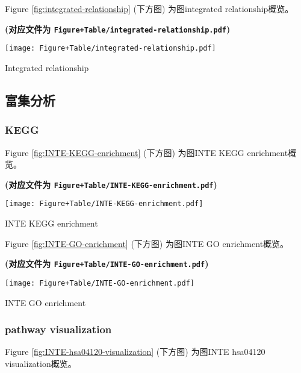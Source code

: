 \documentclass[
]{article}
\begin{document}
Figure \ref{fig:integrated-relationship} (下方图) 为图integrated relationship概览。

\textbf{(对应文件为 \texttt{Figure+Table/integrated-relationship.pdf})}

\def\@captype{figure}
\begin{center}
\texttt{[image: Figure+Table/integrated-relationship.pdf]}
\caption{Integrated relationship}\label{fig:integrated-relationship}
\end{center}

\hypertarget{ux5bccux96c6ux5206ux6790}{%
\subsection{富集分析}\label{ux5bccux96c6ux5206ux6790}}

\hypertarget{kegg}{%
\subsubsection{KEGG}\label{kegg}}

Figure \ref{fig:INTE-KEGG-enrichment} (下方图) 为图INTE KEGG enrichment概览。

\textbf{(对应文件为 \texttt{Figure+Table/INTE-KEGG-enrichment.pdf})}

\def\@captype{figure}
\begin{center}
\texttt{[image: Figure+Table/INTE-KEGG-enrichment.pdf]}
\caption{INTE KEGG enrichment}\label{fig:INTE-KEGG-enrichment}
\end{center}

Figure \ref{fig:INTE-GO-enrichment} (下方图) 为图INTE GO enrichment概览。

\textbf{(对应文件为 \texttt{Figure+Table/INTE-GO-enrichment.pdf})}

\def\@captype{figure}
\begin{center}
\texttt{[image: Figure+Table/INTE-GO-enrichment.pdf]}
\caption{INTE GO enrichment}\label{fig:INTE-GO-enrichment}
\end{center}

\hypertarget{pathway-visualization}{%
\subsubsection{pathway visualization}\label{pathway-visualization}}

Figure \ref{fig:INTE-hsa04120-visualization} (下方图) 为图INTE hsa04120 visualization概览。
\end{document}
